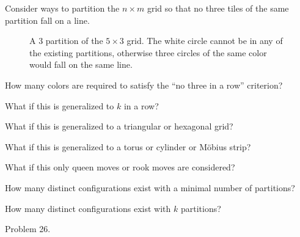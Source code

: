 \documentclass{article}
\begin{document}
Consider ways to partition the $n \times m$ grid so that no three tiles of the
same partition fall on a line.
\begin{figure}[!h]
  \centering
  \caption{
    A $3$ partition of the $5 \times 3$ grid. The white circle cannot be in
    any of the existing partitions, otherwise three circles of the same
    color would fall on the same line.
  }
\end{figure}

\begin{question}
  How many colors are required to satisfy the ``no three in a row'' criterion?
\end{question}
\begin{related}
  \item What if this is generalized to $k$ in a row?
  \item What if this is generalized to a triangular or hexagonal grid?
  \item What if this is generalized to a torus or cylinder or M\"obius strip?
  \item What if this only queen moves or rook moves are considered?
  \item How many distinct configurations exist with a minimal number of partitions?
  \item How many distinct configurations exist with $k$ partitions?
\end{related}
\begin{references}
  \item Problem 26.
\end{references}
\end{document}
